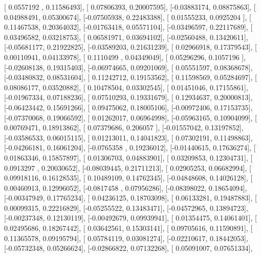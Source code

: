 \documentclass{article}
\begin{document}
       [ 0.0557192 ,  0.11586493],
       [ 0.07806393,  0.20007595],
       [-0.03883174,  0.08875863],
       [ 0.04988491,  0.05300674],
       [-0.07505938,  0.22483388],
       [ 0.01555233,  0.0925204 ],
       [ 0.11467538,  0.20364032],
       [-0.01763418,  0.05571104],
       [-0.03496597,  0.22117689],
       [ 0.03496582,  0.03218753],
       [ 0.06581971,  0.03694102],
       [-0.02560488,  0.13420611],
       [-0.05681177,  0.21922825],
       [-0.03589203,  0.21631239],
       [ 0.02966918,  0.17379543],
       [ 0.00110941,  0.04133978],
       [ 0.1110499 ,  0.04349049],
       [ 0.05296296,  0.1057196 ],
       [-0.02608138,  0.19315403],
       [-0.06974665,  0.09201069],
       [ 0.05551597,  0.08368678],
       [-0.03480832,  0.08531604],
       [ 0.11242712,  0.19153562],
       [ 0.11598569,  0.05284697],
       [ 0.08086177,  0.03520882],
       [ 0.10478504,  0.03302545],
       [ 0.01451046,  0.17155861],
       [-0.01967334,  0.07188236],
       [ 0.07510293,  0.19331679],
       [ 0.12934637,  0.20000813],
       [-0.06423442,  0.15691266],
       [ 0.09475062,  0.18005106],
       [-0.00972406,  0.17153735],
       [-0.07370068,  0.19066592],
       [ 0.01262017,  0.06964998],
       [-0.05963165,  0.10904099],
       [ 0.00769471,  0.18913862],
       [ 0.07379686,  0.206057  ],
       [-0.01557042,  0.13197852],
       [-0.03586533,  0.06015115],
       [ 0.01213011,  0.14041823],
       [ 0.07302191,  0.11498863],
       [-0.04266181,  0.16061204],
       [-0.0765358 ,  0.19236012],
       [-0.01440615,  0.17636274],
       [ 0.01863346,  0.15857897],
       [ 0.01306703,  0.04883901],
       [ 0.03209853,  0.12304731],
       [ 0.0913297 ,  0.20030652],
       [-0.08039445,  0.21711213],
       [ 0.02905253,  0.06682994],
       [ 0.09918116,  0.16128535],
       [ 0.10489109,  0.14762345],
       [-0.04848608,  0.14026128],
       [ 0.00460913,  0.12996052],
       [-0.0817458 ,  0.07956286],
       [-0.08398022,  0.18654094],
       [-0.00347949,  0.17765234],
       [ 0.04236125,  0.18703098],
       [ 0.06133281,  0.19487883],
       [ 0.00099315,  0.22216829],
       [-0.05255522,  0.13483471],
       [-0.04572965,  0.13894723],
       [-0.00237348,  0.12130119],
       [-0.00492679,  0.09939941],
       [ 0.01354475,  0.14061401],
       [ 0.02495686,  0.18267442],
       [ 0.03642561,  0.15303141],
       [ 0.09705616,  0.11590891],
       [ 0.11365578,  0.09195794],
       [ 0.05784119,  0.03081274],
       [-0.02210617,  0.18442053],
       [-0.05732348,  0.05266624],
       [-0.02866822,  0.07132268],
       [ 0.05091007,  0.07651334],
\end{document}
